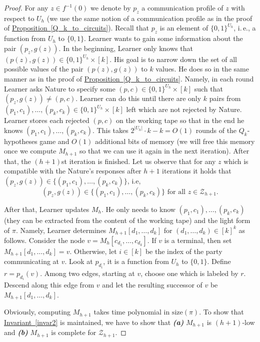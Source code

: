 \documentclass[11pt]{article}
\numberwithin{equation}{section}
\theoremstyle{definition}
\theoremstyle{plain}
\newcommand{\ie}{i.\,e.}
\newcommand{\expref}[2]{\hyperref[#2]{#1~\ref{#2}}}
\begin{document}
\begin{proof}
For any $z\in f^{-1}(0)$ we denote by $p_z$  a communication profile of $z$ with respect to $U_h$ (we use the same notion of a communication profile as in the proof of \expref{Proposition}{Q_k_to_circuits}). Recall that $p_z$ is an element of $\{0, 1\}^{U_h}$, \ie, a function from $U_h$ to $\{0, 1\}$. Learner wants to gain some information about the pair $(p_z, g(z))$. In the beginning, Learner only knows that $(p(z), g(z)) \in \{0,1\}^{U_h}\times[k]$. His goal is to narrow down the set of all possible values of the pair $(p(z), g(z))$ to $k$ values. 
%
 He does so in the same manner as in the proof of \expref{Proposition}{Q_k_to_circuits}.  %
Namely, in each round Learner asks Nature to specify some $(p, c)\in \{0,1\}^{U_h}\times[k]$ such that $(p_z, g(z)) \neq (p, c)$. Learner can do this until there are only $k$ pairs from $(p_1, c_1), \ldots, (p_k, c_k)\in \{0, 1\}^{U_h} \times [k]$ left which are not rejected by Nature. Learner stores each rejected $(p, c)$ on the working tape so that in the end he knows $(p_1, c_1), \ldots, (p_k, c_k)$.  %
 This takes $2^{|U_h|} \cdot k - k = O(1)$ rounds of the $Q_k$-hypotheses game and $O(1)$ additional bits of memory (we will free this memory once we compute $M_{h+1}$ so that we can use it again in the next iteration). After that, the $(h+1)$st iteration is finished. Let us observe that for any $z$ which is compatible with the Nature's responses after $h + 1$ iterations it holds that $(p_z, g(z)) \in\{(p_1, c_1), \ldots, (p_k, c_k)\}$, i.e,   
\begin{equation}
\label{h_equation}
(p_z, g(z)) \in \{(p_1, c_1), \ldots, (p_k, c_k)\} \mbox{ for all } z\in\mathcal{Z}_{h + 1}.
\end{equation}

After that, Learner updates $M_h$. He only needs to know $(p_1, c_1), \ldots, (p_k, c_k)$ (they can be extracted from the content of the working tape) and the light form of $\pi$. Namely, Learner determines $M_{h + 1}[d_1, \ldots, d_k]$ for $(d_1, \ldots, d_k) \in [k]^k$ as follows. Consider the node $v = M_h[c_{d_1}, \ldots, c_{d_k}]$. If $v$ is a terminal, then set $M_{h + 1}[d_1, \ldots, d_k] = v$. Otherwise, let $i\in [k]$ be the index of the party communicating at $v$. Look at $p_{d_i}$, it is a function from $U_h$ to $\{0, 1\}$. Define $r = p_{d_i}(v)$. Among two edges, starting at $v$, choose one which is labeled by $r$. Descend along this edge from $v$ and let the resulting successor of $v$ be $M_{h + 1}[d_1, \ldots, d_k]$.

Obviously, computing $M_{h + 1}$ takes time polynomial in $\mathrm{size}(\pi)$.
To show that \expref{Invariant}{invar2} is maintained, we have to show that \textbf{\emph{(a)}} $M_{h + 1}$ is $(h + 1)$-low and \textbf{\emph{(b)}} $M_{h + 1}$ is complete for $\mathcal{Z}_{h + 1}$.


\end{proof}
\end{document}
